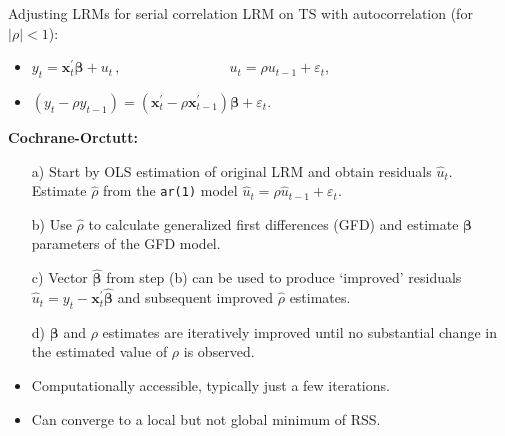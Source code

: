 \documentclass{beamer}
\begin{document}
\begin{frame}{Adjusting LRMs for serial correlation}
LRM on TS with autocorrelation (for $|\rho|<1$):\\ \medskip
\begin{itemize}
    \item $y_t=\bm{x}_t^{\prime} \bm{\beta} + u_t \,,\qquad \qquad \qquad~~~~~~~\, u_t = \rho u_{t-1}+\varepsilon_t$,
    \item $(y_t - \rho y_{t-1}) =  ( \bm{x}_t^{\prime} - \rho \bm{x}_{t-1}^{\prime}) \bm{\beta} + \varepsilon_t$.
\end{itemize}
\medskip
\textbf{Cochrane-Orctutt:} \\ \medskip
\begin{itemize}
    \item[a)] Start by OLS estimation of original LRM and obtain residuals $\hat{u}_t$. Estimate $\hat{\rho}$ from the \texttt{ar(1)} model $\hat{u}_t = \rho \hat{u}_{t-1}+\varepsilon_t$. 
    \item[b)] Use $\hat{\rho}$ to calculate generalized first differences (GFD) and estimate $\bm{\beta}$ parameters of the GFD model.
    \item[c)] Vector $\hat{\bm{\beta}}$ from step (b) can be used to produce `improved' residuals $\hat{u}_t = y_t - \bm{x}_t^{\prime}\hat{\bm{\beta}}$ and subsequent improved $\hat{\rho}$ estimates. 
    \item[d)] $\bm{\beta}$ and $\rho$ estimates are iteratively improved until no substantial change in the estimated value of $\rho$ is observed.
    \medskip
    \item Computationally accessible, typically just a few iterations.
    \item Can converge to a local but not global minimum of RSS.
\end{itemize}
\end{frame}
\end{document}
